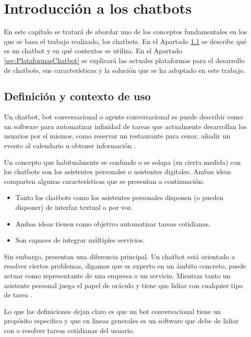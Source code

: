 \chapter{Introducción a los chatbots}
\label{cha:IntroChatbot}

En este capítulo se tratará de abordar uno de los conceptos fundamentales en los que se basa el trabajo realizado, los chatbots. En el Apartado \ref{sec:DefinicionChatbot} se describe qué es un chatbot y en qué contextos se utiliza. En el Apartado \ref{sec:PlataformasChatbot} se explicará las actuales plataformas para el desarrollo de chatbots, sus características y la solución que se ha adoptado en este trabajo.

\section{Definición y contexto de uso}
\label{sec:DefinicionChatbot}

Un chatbot, bot conversacional o agente conversacional se puede describir como un software para automatizar infinidad de tareas que actualmente desarrollan los usuarios por sí mismos, como reservar un restaurante para cenar, añadir un evento al calendario u obtener información \cite{Wagner2016}.

Un concepto que habitualmente se confunde o se solapa (en cierta medida) con los chatbots son los asistentes personales o asistentes digitales. Ambas ideas comparten algunas características que se presentan a continuación:
\begin{itemize}
	\item Tanto los chatbots como los asistentes personales disponen (o pueden disponer) de interfaz textual o por voz.
	\item Ambas ideas tienen como objetivo automatizar tareas cotidianas.
	\item Son capaces de integrar múltiples servicios.
\end{itemize}

Sin embargo, presentan una diferencia principal. Un chatbot está orientado a resolver ciertos problemas, digamos que es experto en un ámbito concreto, puede actuar como representante de una empresa o un servicio. Mientras tanto un asistente personal juega el papel de oráculo y tiene que lidiar con cualquier tipo de tarea \cite{Wright2016}.

Lo que las definiciones dejan claro es que un bot conversacional tiene un propósito especifico y que en lineas generales es un software que debe de lidiar con o resolver tareas cotidianas del usuario.


